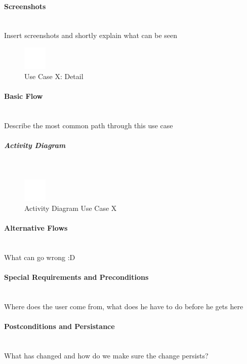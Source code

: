 \paragraph*{Screenshots}\mbox{}\\
Insert screenshots and shortly explain what can be seen
\begin{figure}[h] 
	\centering
	\includegraphics[width=0.1\textwidth]{Content/Domain/placeholder.png}
	\caption{Use Case X: Detail}
	\label{fig:label1}
\end{figure}

\paragraph*{Basic Flow} \mbox{}\\

Describe the most common path through this use case

\subparagraph{Activity Diagram}\mbox{}\\
\begin{figure}[h]
	\centering
	\includegraphics[width=0.1\textwidth]{Content/Domain/placeholder.png}
	\caption{Activity Diagram Use Case X}
	\label{fig:label11}
\end{figure}

\paragraph*{Alternative Flows}\mbox{}\\
What can go wrong :D

\paragraph*{Special Requirements and Preconditions}\mbox{}\\
Where does the user come from, what does he have to do before he gets here

\paragraph*{Postconditions and Persistance}\mbox{}\\
What has changed and how do we make sure the change persists?

